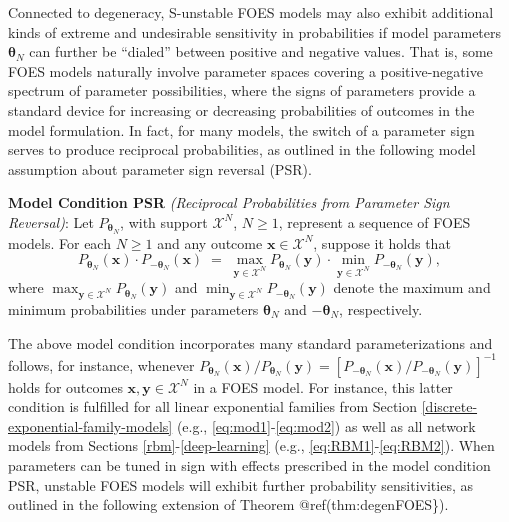\documentclass[]{article}
\theoremstyle{definition}
\begin{document}
Connected to degeneracy, S-unstable FOES models may also exhibit
additional kinds of extreme and undesirable sensitivity in probabilities
if model parameters \(\boldsymbol \theta_N\) can further be ``dialed''
between positive and negative values. That is, some FOES models
naturally involve parameter spaces covering a positive-negative spectrum
of parameter possibilities, where the signs of parameters provide a
standard device for increasing or decreasing probabilities of outcomes
in the model formulation. In fact, for many models, the switch of a
parameter sign serves to produce reciprocal probabilities, as outlined
in the following model assumption about parameter sign reversal (PSR).

\textbf{Model Condition PSR} \emph{(Reciprocal Probabilities from
Parameter Sign Reversal)}: Let \(P_{\boldsymbol \theta_N}\), with
support \(\mathcal{X}^N\), \(N\geq 1\), represent a sequence of FOES
models. For each \(N \geq 1\) and any outcome
\(\boldsymbol x \in \mathcal{X}^N\), suppose it holds that \[
P_{\boldsymbol \theta_N}(\boldsymbol x)  \cdot P_{-\boldsymbol \theta_N}(\boldsymbol x) \;=\;   \max\limits_{\boldsymbol y \in \mathcal{X}^N}P_{ \boldsymbol \theta_N}(\boldsymbol y)\cdot \min\limits_{\boldsymbol y \in \mathcal{X}^N}P_{-\boldsymbol \theta_N}(\boldsymbol y),
\] where
\(\max_{\boldsymbol y \in \mathcal{X}^N}P_{ \boldsymbol \theta_N}(\boldsymbol y)\)
and
\(\min_{\boldsymbol y \in \mathcal{X}^N}P_{-\boldsymbol \theta_N}(\boldsymbol y)\)
denote the maximum and minimum probabilities under parameters
\(\boldsymbol \theta_N\) and \(-\boldsymbol \theta_N\), respectively.

The above model condition incorporates many standard parameterizations
and follows, for instance, whenever
\(P_{\boldsymbol \theta_N}(\boldsymbol x)/P_{\boldsymbol \theta_N}(\boldsymbol y) = [P_{-\boldsymbol \theta_N}(\boldsymbol x)/P_{-\boldsymbol \theta_N}(\boldsymbol y)]^{-1}\)
holds for outcomes \(\boldsymbol x, \boldsymbol y \in\mathcal{X}^N\) in
a FOES model. For instance, this latter condition is fulfilled for all
linear exponential families from Section
\ref{discrete-exponential-family-models} (e.g.,
\eqref{eq:mod1}-\eqref{eq:mod2}) as well as all network models from Sections
\ref{rbm}-\ref{deep-learning} (e.g., \eqref{eq:RBM1}-\eqref{eq:RBM2}). When
parameters can be tuned in sign with effects prescribed in the model
condition PSR, unstable FOES models will exhibit further probability
sensitivities, as outlined in the following extension of Theorem
@ref(thm:degenFOES\}).
\end{document}
